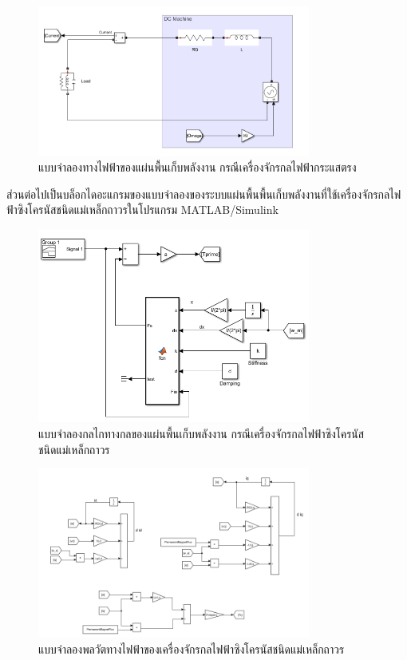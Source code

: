\documentclass[11pt,a4paper]{article}
\begin{document}
\begin{figure}[H]
    \centering
    \includegraphics[width=0.8\textwidth]{elec_model_dc.png}
    \caption{แบบจำลองทางไฟฟ้าของแผ่นพื้นเก็บพลังงาน กรณีเครื่องจักรกลไฟฟ้ากระแสตรง}
\end{figure}
ส่วนต่อไปเป็นบล็อกไดอะแกรมของแบบจำลองของระบบแผ่นพื้นพื้นเก็บพลังงานที่ใช้เครื่องจักรกลไฟฟ้าซิงโครนัสชนิดแม่เหล็กถาวรในโปรแกรม MATLAB/Simulink
\begin{figure}[H]
    \centering
    \includegraphics[width=0.8\textwidth]{mech_model_ac.png}
    \caption{แบบจำลองกลไกทางกลของแผ่นพื้นเก็บพลังงาน กรณีเครื่องจักรกลไฟฟ้าซิงโครนัสชนิดแม่เหล็กถาวร}
\end{figure}
\begin{figure}[H]
    \centering
    \includegraphics[width=0.8\textwidth]{elec_model_ac.png}
    \caption{แบบจำลองพลวัตทางไฟฟ้าของเครื่องจักรกลไฟฟ้าซิงโครนัสชนิดแม่เหล็กถาวร}
\end{figure}
\end{document}
